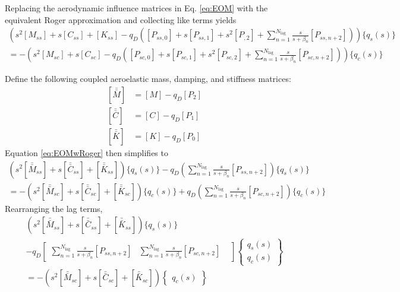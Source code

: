 Replacing the aerodynamic influence matrices in Eq. \ref{eq:EOM} with the equivalent Roger approximation and collecting like terms yields
\begin{multline}
	\label{eq:EOMwRoger}
	\left( s^2 [M_{ss}] + s [C_{ss}] + [K_{ss}]
	- q_D \left( [P_{ss,0}] + s[P_{ss,1}] + s^2 [P_{,2}] + \sum_{n=1}^{N_\text{lag}} \frac{s}{s+\beta_n} [P_{ss,n+2}] \right) \right) \{ q_s(s)\} \\
	=
	- \left( s^2 [M_{sc}] + s [C_{sc}] - q_D \left( [P_{sc,0}] + s [P_{sc,1}] + s^2 [P_{sc,2}] + \sum_{n=1}^{N_\text{lag}} \frac{s}{s+\beta_n} [P_{sc,n+2}] \right) \right) \{q_c(s)\}
\end{multline}

Define the following coupled aeroelastic mass, damping, and stiffness matrices:
\begin{equation}
\begin{aligned}
	\left[\bar{\bar{M}}\right] &= [M] - q_D [P_2] \\
	\left[\bar{\bar{C}}\right] &= [C] - q_D [P_1] \\
	\left[\bar{\bar{K}}\right] &= [K] - q_D [P_0]
\end{aligned}
\end{equation}
Equation \ref{eq:EOMwRoger} then simplifies to
\begin{multline}
	\left( s^2 \left[\bar{\bar{M}}_{ss}\right] + s \left[\bar{\bar{C}}_{ss}\right] + \left[\bar{\bar{K}}_{ss}\right] \right) \{ q_s(s)\}
	- q_D \left(\sum_{n=1}^{N_\text{lag}} \frac{s}{s+\beta_n} [P_{ss,n+2}] \right) \{ q_s(s)\} \\
	=
	- \left( s^2 \left[\bar{\bar{M}}_{sc}\right] + s \left[\bar{\bar{C}}_{sc}\right] + \left[\bar{\bar{K}}_{sc}\right] \right) \{q_c(s)\} + q_D \left(\sum_{n=1}^{N_\text{lag}} \frac{s}{s+\beta_n} [P_{sc,n+2}] \right) \{q_c(s)\}
\end{multline}
Rearranging the lag terms,
\begin{multline}
	\label{eq:EOMcoupled}
	\left( s^2 \left[\bar{\bar{M}}_{ss}\right] + s \left[\bar{\bar{C}}_{ss}\right] + \left[\bar{\bar{K}}_{ss}\right] \right) \{ q_s(s)\}
	\\
	- q_D \begin{bmatrix}
		\sum_{n=1}^{N_\text{lag}} \frac{s}{s+\beta_n} [P_{ss,n+2}] &
		\sum_{n=1}^{N_\text{lag}} \frac{s}{s+\beta_n} [P_{sc,n+2}] &
	\end{bmatrix} \begin{Bmatrix} q_s(s) \\ q_c(s) \end{Bmatrix}
	\\
	= - \left( s^2 \left[\bar{\bar{M}}_{sc}\right] + s \left[\bar{\bar{C}}_{sc}\right] + \left[ \bar{\bar{K}}_{sc} \right] \right) \begin{Bmatrix} q_c(s) \end{Bmatrix}
\end{multline}

